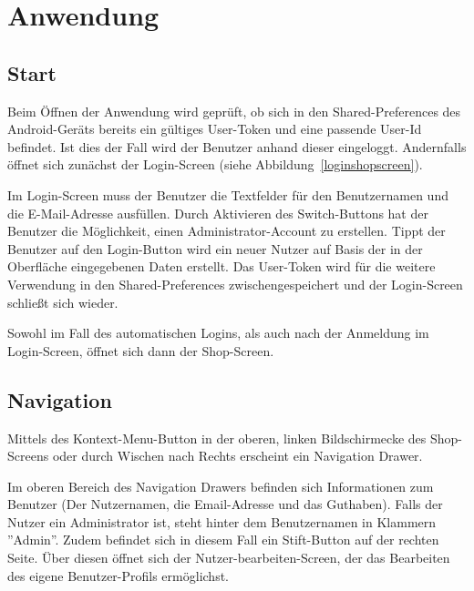 \section{Anwendung}\label{sec:features}

\subsection{Start}\label{subsec:start}

Beim Öffnen der Anwendung wird geprüft, ob sich in den Shared-Preferences des Android-Geräts bereits ein gültiges User-Token und eine passende User-Id befindet.
Ist dies der Fall wird der Benutzer anhand dieser eingeloggt.
Andernfalls öffnet sich zunächst der Login-Screen (siehe Abbildung~\ref{loginshopscreen}).

Im Login-Screen muss der Benutzer die Textfelder für den Benutzernamen und die E-Mail-Adresse ausfüllen.
Durch Aktivieren des Switch-Buttons hat der Benutzer die Möglichkeit, einen Administrator-Account zu erstellen.
Tippt der Benutzer auf den Login-Button wird ein neuer Nutzer auf Basis der in der Oberfläche eingegebenen Daten erstellt.
Das User-Token wird für die weitere Verwendung in den Shared-Preferences zwischengespeichert und der Login-Screen schließt sich wieder.

Sowohl im Fall des automatischen Logins, als auch nach der Anmeldung im Login-Screen, öffnet sich dann der Shop-Screen.


\subsection{Navigation} \label{subsec:navigation}

Mittels des Kontext-Menu-Button in der oberen, linken Bildschirmecke des Shop-Screens oder durch Wischen nach Rechts erscheint ein Navigation Drawer.

Im oberen Bereich des Navigation Drawers befinden sich Informationen zum Benutzer (Der Nutzernamen, die Email-Adresse und das Guthaben).
Falls der Nutzer ein Administrator ist, steht hinter dem Benutzernamen in Klammern ''Admin''.
Zudem befindet sich in diesem Fall ein Stift-Button auf der rechten Seite.
Über diesen öffnet sich der Nutzer-bearbeiten-Screen, der das Bearbeiten des eigene Benutzer-Profils ermöglichst.

